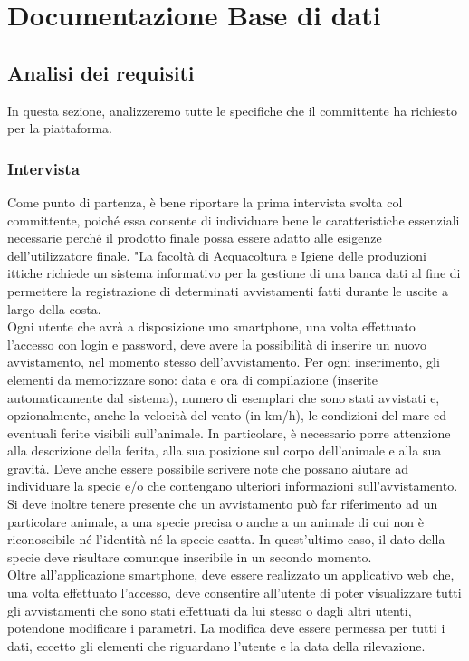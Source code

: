 \documentclass[a4paper,final,12pt]{report}
\begin{document}
\chapter{Documentazione Base di dati}
\section{Analisi dei requisiti}
In questa sezione, analizzeremo tutte le specifiche che il committente ha richiesto per la piattaforma.

\subsection{Intervista}
Come punto di partenza, è bene riportare la prima intervista svolta col committente, poiché essa consente di individuare bene le caratteristiche essenziali necessarie perché il prodotto finale possa essere adatto alle esigenze dell'utilizzatore finale. 
"La facoltà di Acquacoltura e Igiene delle produzioni ittiche richiede un sistema informativo per la gestione di una banca dati al fine di permettere la registrazione di determinati avvistamenti fatti durante le uscite a largo della costa.\\
Ogni utente che avrà a disposizione uno smartphone, una volta effettuato l'accesso con login e password, deve avere la possibilità di inserire un nuovo avvistamento, nel momento stesso dell'avvistamento. Per ogni inserimento, gli elementi da memorizzare sono: data e ora di compilazione  (inserite automaticamente dal sistema), numero di esemplari che sono stati avvistati e, opzionalmente, anche la velocità del vento (in km/h), le condizioni del mare ed eventuali ferite visibili sull'animale. In particolare, è necessario porre attenzione alla descrizione della ferita, alla sua posizione sul corpo dell'animale e alla sua gravità. Deve anche essere possibile scrivere note che possano aiutare ad individuare la specie e/o che contengano ulteriori informazioni sull'avvistamento. 
\\
Si deve inoltre tenere presente che un avvistamento può far riferimento ad un particolare animale, a una specie precisa o anche a un animale di cui non è riconoscibile né l'identità né la specie esatta. In quest'ultimo caso, il dato della specie deve risultare comunque inseribile in un secondo momento.
\\
Oltre all'applicazione smartphone, deve essere realizzato un applicativo web che, una volta effettuato l'accesso, deve consentire all'utente di poter visualizzare tutti gli avvistamenti che sono stati effettuati da lui stesso o dagli altri utenti, potendone modificare i parametri. La modifica deve essere permessa per tutti i dati, eccetto gli elementi che riguardano l'utente e la data della rilevazione.
\end{document}
